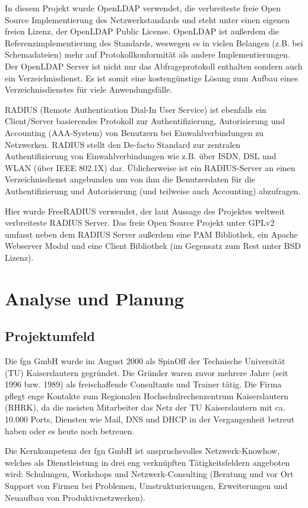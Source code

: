 \documentclass[11pt,a4paper,titlepage=firstiscover]{scrartcl} %
\begin{document}
In diesem Projekt wurde OpenLDAP verwendet, die verbreiteste freie Open Source Implementierung des Netzwerkstandards und steht unter einen eigenen freien Lizenz, der OpenLDAP Public License. OpenLDAP ist au\ss{}erdem die Referenzimplementierung des Standards, weswegen es in vielen Belangen (z.B. bei Schemadateien) mehr auf Protokollkonformit\"at als andere Implementierungen. Der OpenLDAP Server ist nicht nur das Abfrageprotokoll enthalten sondern auch ein Verzeichnisdienst. Es ist somit eine kosteng\"unstige L\"osung zum Aufbau eines Verzeichnisdienstes f\"ur viele Anwendungsf\"alle.

RADIUS (Remote Authentication Dial-In User Service) ist ebenfalls ein Client/Server basierendes Protokoll zur Authentifizierung, Autorisierung und Accounting (AAA-System) von Benutzern bei Einwahlverbindungen zu Netzwerken. RADIUS stellt den De-facto Standard zur zentralen Authentifizierung von Einwahlverbindungen wie z.B. über ISDN, DSL und WLAN (\"uber IEEE 802.1X) dar. \"Ublicherweise ist ein RADIUS-Server an einen Verzeichnisdienst angebunden um von ihm die Benutzerdaten f\"ur die Authentifizierung und Autorisierung (und teilweise auch Accounting) abzufragen.

Hier wurde FreeRADIUS verwendet, der laut Aussage des Projektes weltweit verbreiteste RADIUS Server. Das freie Open Source Projekt unter GPLv2 umfasst neben dem RADIUS Server au\ss{}erdem eine PAM Bibliothek, ein Apache Webserver Modul und eine Client Bibliothek (im Gegensatz zum Rest unter BSD Lizenz).

\section{Analyse und Planung}
\subsection{Projektumfeld}
Die fgn GmbH wurde im August 2000 als SpinOff der Technische Universität (TU) Kaiserslautern gegründet. Die Gründer waren zuvor mehrere Jahre (seit 1996 bzw. 1989) als freischaffende Consultants und Trainer tätig. Die Firma pflegt enge Kontakte zum Regionalen Hochschulrechenzentrum Kaiserslautern (RHRK), da die meisten Mitarbeiter das Netz der TU Kaiserslautern mit ca. 10.000 Ports, Diensten wie Mail, DNS und DHCP in der Vergangenheit betreut haben oder es heute noch betreuen.

Die Kernkompetenz der fgn GmbH ist anspruchsvolles Netzwerk-Knowhow, welches als Dienstleistung in drei eng verknüpften Tätigkeitsfeldern angeboten wird: Schulungen, Workshops und Netzwerk-Consulting (Beratung und vor Ort Support von Firmen bei Problemen, Umstrukturierungen, Erweiterungen und Neuaufbau von Produktivnetzwerken).
\end{document}
